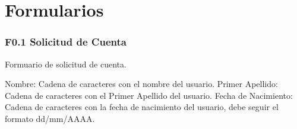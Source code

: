 \chapter{Formularios}
\label{appendix:Formularios}

\subsection{F0.1 Solicitud de Cuenta }
  Formuario de solicitud de cuenta.\\

	\begin{UClist}
      \UCli Nombre: Cadena de caracteres con el nombre del usuario.
      \UCli Primer Apellido: Cadena de caracteres con el Primer Apellido del usuario.
      \UCli Fecha de Nacimiento: Cadena de caracteres con la fecha de nacimiento del usuario, debe seguir el formato dd/mm/AAAA.
    \end{UClist}
















